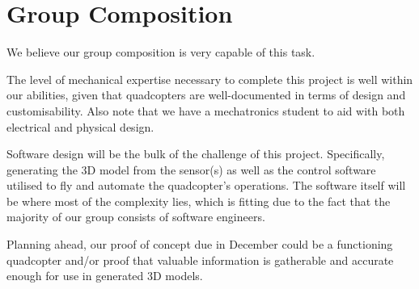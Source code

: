\documentclass[10pt,letterpaper]{article}
\begin{document}
\section*{Group Composition}
We believe our group composition is very capable of this task. \par 
The level of mechanical expertise necessary to complete this project is well within our abilities, given that quadcopters are well-documented in terms of design and customisability. Also note that we have a mechatronics student to aid with both electrical and physical design. \par 
Software design will be the bulk of the challenge of this project. Specifically, generating the 3D model from the sensor(s) as well as the control software utilised to fly and automate the quadcopter's operations. The software itself will be where most of the complexity lies, which is fitting due to the fact that the majority of our group consists of software engineers. \par 
Planning ahead, our proof of concept due in December could be a functioning quadcopter and/or proof that valuable information is gatherable and accurate enough for use in generated 3D models.
\end{document}
